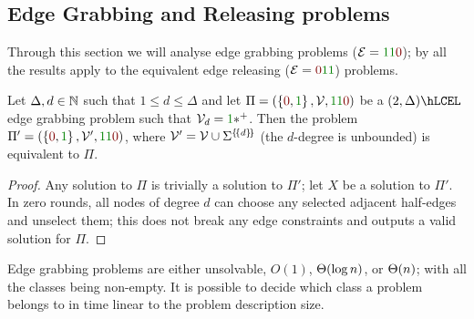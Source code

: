 \documentclass[12pt,a4paper]{article}
\begin{document}
\subsection{Edge Grabbing and Releasing problems}
Through this section we will analyse edge grabbing problems ($\Ec=\y\y\n$); by  all the results apply to the equivalent edge releasing ($\Ec=\n\y\y$) problems.
\begin{lem}
    Let $\Delta,d\in\mathbb{N}$ such that $1\leq d\leq\Delta$ and let $\Pi=(\Set{\n,\y},\Vc,\y\y\n)$ be a $(2,\Delta)\hLCEL$ edge grabbing problem such that $\Vc_d=\y\xpl$. Then the problem $\Pi'=(\Set{\n,\y},\Vc',\y\y\n)$, where $\mathcal{V}'=\mathcal{V}\cup\Sigma^{\left\lbrace \! \left\lbrace d\right\rbrace \! \right\rbrace}$ (the $d$-degree is unbounded) is equivalent to $\Pi$.
\end{lem}
\begin{proof}
    Any solution to $\Pi$ is trivially a solution to $\Pi'$; let $X$ be a solution to $\Pi'$. In zero rounds, all nodes of degree $d$ can choose any selected adjacent half-edges and unselect them; this does not break any edge constraints and outputs a valid solution for $\Pi$.
\end{proof}
\begin{thm}\label{thm:eg}
    Edge grabbing problems are either unsolvable, $O(1)$, $\Theta(\log n)$, or $\Theta(n)$; with all the classes being non-empty. It is possible to decide which class a problem belongs to in time linear to the problem description size.
\end{thm}
\end{document}
